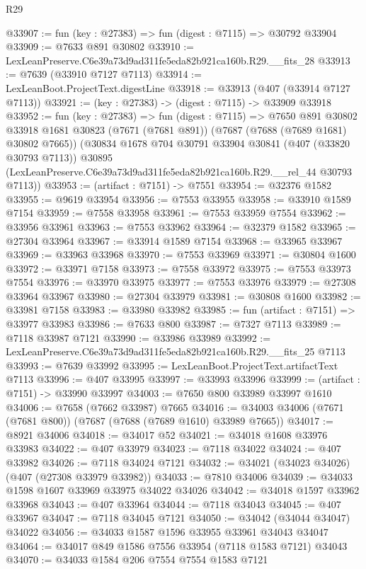 \begin{lexlean}{R29}
\begin{coremodule}
@33907 := fun (key : @27383) => fun (digest : @7115) => @30792 @33904
@33909 := @7633 @891 @30802
@33910 := LexLeanPreserve.C6e39a73d9ad311fe5eda82b921ca160b.R29.__fits_28
@33913 := @7639 (@33910 @7127 @7113)
@33914 := LexLeanBoot.ProjectText.digestLine
@33918 := @33913 (@407 (@33914 @7127 @7113))
@33921 := (key : @27383) -> (digest : @7115) -> @33909 @33918
@33952 := fun (key : @27383) =>
  fun (digest : @7115) =>
  @7650
    @891
    @30802
    @33918
    @1681
    @30823
    (@7671 (@7681 @891))
    (@7687 (@7688 (@7689 @1681) @30802 @7665))
    (@30834
      @1678
      @704
      @30791
      @33904
      @30841
      (@407 (@33820 @30793 @7113))
      @30895
      (LexLeanPreserve.C6e39a73d9ad311fe5eda82b921ca160b.R29.__rel_44 @30793 @7113))
@33953 := (artifact : @7151) -> @7551
@33954 := @32376 @1582
@33955 := @9619 @33954
@33956 := @7553 @33955
@33958 := @33910 @1589 @7154
@33959 := @7558 @33958
@33961 := @7553 @33959 @7554
@33962 := @33956 @33961
@33963 := @7553 @33962
@33964 := @32379 @1582
@33965 := @27304 @33964
@33967 := @33914 @1589 @7154
@33968 := @33965 @33967
@33969 := @33963 @33968
@33970 := @7553 @33969
@33971 := @30804 @1600
@33972 := @33971 @7158
@33973 := @7558 @33972
@33975 := @7553 @33973 @7554
@33976 := @33970 @33975
@33977 := @7553 @33976
@33979 := @27308 @33964 @33967
@33980 := @27304 @33979
@33981 := @30808 @1600
@33982 := @33981 @7158
@33983 := @33980 @33982
@33985 := fun (artifact : @7151) => @33977 @33983
@33986 := @7633 @800
@33987 := @7327 @7113
@33989 := @7118 @33987 @7121
@33990 := @33986 @33989
@33992 := LexLeanPreserve.C6e39a73d9ad311fe5eda82b921ca160b.R29.__fits_25 @7113
@33993 := @7639 @33992
@33995 := LexLeanBoot.ProjectText.artifactText @7113
@33996 := @407 @33995
@33997 := @33993 @33996
@33999 := (artifact : @7151) -> @33990 @33997
@34003 := @7650 @800 @33989 @33997 @1610
@34006 := @7658 (@7662 @33987) @7665
@34016 := @34003 @34006 (@7671 (@7681 @800)) (@7687 (@7688 (@7689 @1610) @33989 @7665))
@34017 := @8921 @34006
@34018 := @34017 @52
@34021 := @34018 @1608 @33976 @33983
@34022 := @407 @33979
@34023 := @7118 @34022
@34024 := @407 @33982
@34026 := @7118 @34024 @7121
@34032 := @34021 (@34023 @34026) (@407 (@27308 @33979 @33982))
@34033 := @7810 @34006
@34039 := @34033 @1598 @1607 @33969 @33975 @34022 @34026
@34042 := @34018 @1597 @33962 @33968
@34043 := @407 @33964
@34044 := @7118 @34043
@34045 := @407 @33967
@34047 := @7118 @34045 @7121
@34050 := @34042 (@34044 @34047) @34022
@34056 := @34033 @1587 @1596 @33955 @33961 @34043 @34047
@34064 := @34017 @849 @1586 @7556 @33954 (@7118 @1583 @7121) @34043
@34070 := @34033 @1584 @206 @7554 @7554 @1583 @7121

\end{coremodule}
\end{lexlean}
